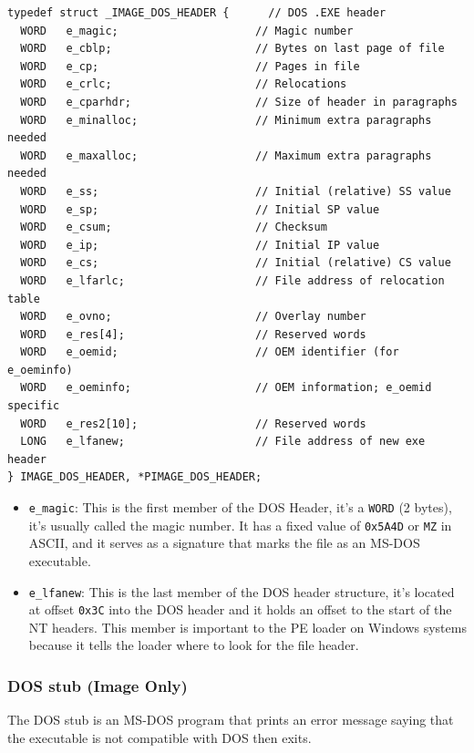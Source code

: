 \begin{verbatim}
typedef struct _IMAGE_DOS_HEADER {      // DOS .EXE header
  WORD   e_magic;                     // Magic number
  WORD   e_cblp;                      // Bytes on last page of file
  WORD   e_cp;                        // Pages in file
  WORD   e_crlc;                      // Relocations
  WORD   e_cparhdr;                   // Size of header in paragraphs
  WORD   e_minalloc;                  // Minimum extra paragraphs needed
  WORD   e_maxalloc;                  // Maximum extra paragraphs needed
  WORD   e_ss;                        // Initial (relative) SS value
  WORD   e_sp;                        // Initial SP value
  WORD   e_csum;                      // Checksum
  WORD   e_ip;                        // Initial IP value
  WORD   e_cs;                        // Initial (relative) CS value
  WORD   e_lfarlc;                    // File address of relocation table
  WORD   e_ovno;                      // Overlay number
  WORD   e_res[4];                    // Reserved words
  WORD   e_oemid;                     // OEM identifier (for e_oeminfo)
  WORD   e_oeminfo;                   // OEM information; e_oemid specific
  WORD   e_res2[10];                  // Reserved words
  LONG   e_lfanew;                    // File address of new exe header
} IMAGE_DOS_HEADER, *PIMAGE_DOS_HEADER;
\end{verbatim}

\begin{itemize}

    \item \verb+e_magic+: This is the first member of the DOS Header, it’s a \verb+WORD+ (2 bytes), it’s usually called the magic number. It has a fixed value of \verb+0x5A4D+ or \verb+MZ+ in ASCII, and it serves as a signature that marks the file as an MS-DOS executable.
    \item \verb+e_lfanew+: This is the last member of the DOS header structure, it’s located at offset \verb+0x3C+ into the DOS header and it holds an offset to the start of the NT headers. This member is important to the PE loader on Windows systems because it tells the loader where to look for the file header.
\end{itemize}

\subsubsection{DOS stub (Image Only)}

The DOS stub is an MS-DOS program that prints an error message saying that the executable is not compatible with DOS then exits. 

